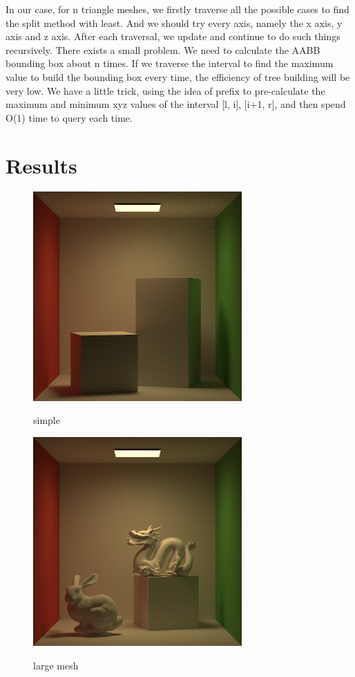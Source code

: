 \documentclass[acmtog]{acmart}
\begin{document}
In our case, for n triangle meshes, we firstly traverse all the possible cases to
find the split method with least. And we should try every axis, namely the x
axis, y axis and z axis. After each traversal, we update and continue to do such things recursively.
There exists a small problem. We need to calculate the AABB bounding box about n times. If we traverse the interval to find the maximum value to build the bounding box every time, the efficiency of tree building will be very low. We have a little trick, using the idea of prefix to pre-calculate the maximum and minimum xyz values of the interval [l, i], [i+1, r], and then spend O(1) time to query each time.
\section{Results}
\begin{figure}[h]
	\centering
	{\includegraphics[width=8cm]{result0.png}}	
	\caption{simple}
\end{figure}
\begin{figure}[h]
	\centering
	{\includegraphics[width=8cm]{result1.png}}	
	\caption{large mesh}
\end{figure}
\end{document}
